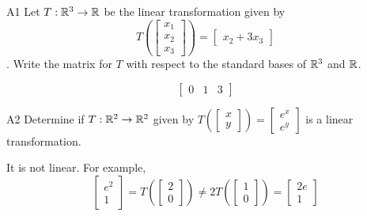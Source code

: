 \documentclass{sbgLAquiz}
\begin{document}
\begin{problem}{A1}
Let $T: \mathbb{R}^3 \rightarrow \mathbb{R}$ be the linear transformation given by $$T\left(\begin{bmatrix} x_1 \\ x_2 \\ x_3  \end{bmatrix} \right) = \begin{bmatrix} x_2+3x_3 \end{bmatrix}$$. Write the matrix for $T$ with respect to the standard bases of $\mathbb{R}^3$ and $\mathbb{R}$.
\end{problem}
\begin{solution}
$$\begin{bmatrix} 0 & 1 & 3 \end{bmatrix}$$
\end{solution}
\begin{extract}\newpage\end{extract}
\begin{problem}{A2} 
 Determine if $T: \mathbb{R}^2 \rightarrow \mathbb{R}^2$ given by $T\left(\begin{bmatrix} x \\ y \end{bmatrix}\right) = \begin{bmatrix} e^{x} \\ e^y \end{bmatrix}$ is a linear transformation.
\end{problem}
\begin{solution}
It is not linear.  For example, $$\begin{bmatrix}e^2 \\ 1 \end{bmatrix} = T\left(\begin{bmatrix} 2 \\ 0 \end{bmatrix} \right) \neq 2 T\left(\begin{bmatrix} 1 \\ 0 \end{bmatrix}\right)=\begin{bmatrix} 2e \\ 1 \end{bmatrix}$$
\end{solution}
\end{document}
